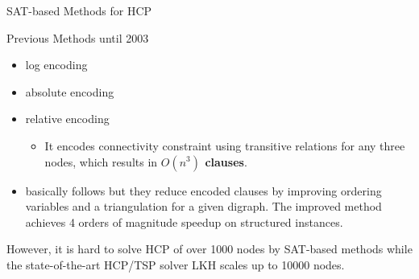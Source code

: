 \documentclass{beamer}
\begin{document}
\begin{frame}{SAT-based Methods for HCP}
\begin{block}{Previous Methods until 2003}
\begin{itemize}
\item \mbox{} log encoding
\item \mbox{} absolute encoding
\item \mbox{} relative encoding
\begin{itemize}
\item It encodes connectivity constraint using transitive relations for any
  three nodes, which results in \alert{{\bf $O(n^{3})$ clauses}}.
\end{itemize}
\end{itemize}
\end{block}

\pause
\begin{block}{\cite{DBLP:conf/ausai/VelevG09}}
\begin{itemize}
\item \mbox{} basically follows
\cite{DBLP:journals/dam/Prestwich03}
 but they reduce encoded clauses by improving ordering variables and a triangulation for a given digraph. 
The improved method achieves 4 orders of magnitude speedup on structured instances.
\end{itemize}
\end{block}

\pause
\begin{alertblock}{}
However, it is hard to solve HCP of over 1000 nodes by SAT-based
methods while the state-of-the-art HCP/TSP solver \textsf{LKH} scales up to 10000 nodes. 
\end{alertblock}
\end{frame}
\end{document}
